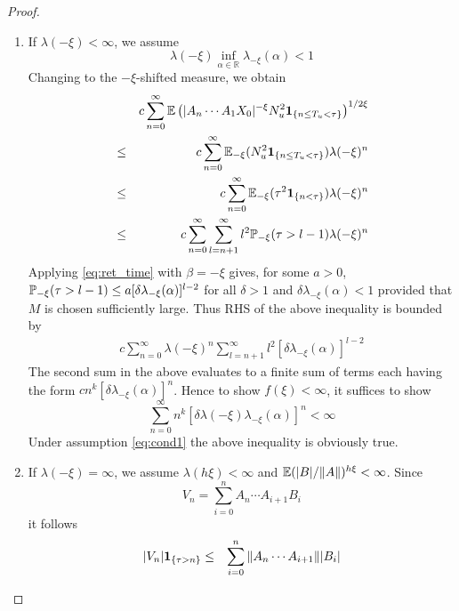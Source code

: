 \documentclass{article}
\theoremstyle{remark}
\begin{document}
\begin{proof}
  \begin{enumerate}
  \item If $\lambda(-\xi) < \infty$, we assume
    \begin{equation}
      \label{eq:cond1}
      \lambda(-\xi)
      \inf_{\alpha \in \mathbb R} \lambda_{-\xi}(\alpha) < 1
    \end{equation}
    Changing to the $-\xi$-shifted measure, we obtain
    \begin{eqnarray}
      &&
      c \sum_{n=0}^\infty
      \E \left(
        |A_n \cdots A_1 X_0|^{-\xi}
        N_u^2
        \1{n \leq T_u < \tau}        
      \right)^{1/2\xi} \\
      &\leq&
      c \sum_{n=0}^\infty
      \E_{-\xi} (N_u^2 \1{n \leq T_u < \tau})
      \lambda(-\xi)^n \\
      &\leq&
      c \sum_{n=0}^\infty
      \E_{-\xi} (\tau^2 \1{n < \tau})
      \lambda(-\xi)^n \\
      &\leq&
      c \sum_{n=0}^\infty
      \sum_{l=n+1}^\infty
      l^2 \P_{-\xi}(\tau > l-1)
      \lambda(-\xi)^n
    \end{eqnarray}
    Applying \eqref{eq:ret_time} with $\beta = -\xi$ gives, for some
    $a > 0$, $\P_{-\xi}(\tau > l-1) \leq a [\delta \lambda_{-\xi}(\alpha)]^{l-2}$
    for all $\delta > 1$ and $\delta \lambda_{-\xi}(\alpha) < 1$
    provided that $M$ is chosen sufficiently large. Thus RHS of the
    above inequality is bounded by
    \begin{eqnarray*}
      c \sum_{n=0}^\infty
      \lambda(-\xi)^n
      \sum_{l=n+1}^\infty
      l^2 [\delta \lambda_{-\xi}(\alpha)]^{l-2}
    \end{eqnarray*}
    The second sum in the above evaluates to a finite sum of terms
    each having the form $c n^k [\delta
    \lambda_{-\xi}(\alpha)]^n$. Hence to show $f(\xi) < \infty$, it
    suffices to show
    \begin{equation*}
      \sum_{n=0}^\infty
      n^k [\delta \lambda(-\xi) \lambda_{-\xi}(\alpha)]^n < \infty
    \end{equation*}
    Under assumption \eqref{eq:cond1} the above inequality is
    obviously true.
  \item If $\lambda(-\xi) = \infty$, we assume $\lambda(h\xi) <
    \infty$ and $\E(|B|/\|A\|)^{h\xi} <  \infty$. Since
    \[
    V_n = \sum_{i=0}^n A_n \cdots A_{i+1} B_i
    \]
    it follows
    \begin{eqnarray*}
      |V_n|\1{\tau > n} &\leq&
      \sum_{i=0}^{n} \|A_n \cdots A_{i+1}\| |B_i| \\

\end{eqnarray*}
\end{enumerate}
\end{proof}
\end{document}
